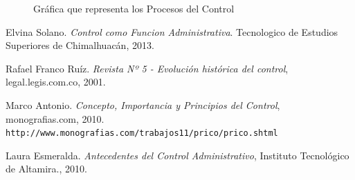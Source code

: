 \documentclass[12pt,letterpaper]{article}
\begin{document}
\begin{figure}[ht]
\centering
{}
\caption{Gráfica que representa los Procesos del Control}
\end{figure}



\newpage


\begin{thebibliography}{9}
Elvina Solano.
\textit{Control como Funcion Administrativa}. 
Tecnologico de Estudios Superiores de Chimalhuacán, 2013.
 
Rafael Franco Ruíz. \textit{Revista Nº 5 - Evolución histórica del control}, legal.legis.com.co, 2001.

 
Marco Antonio. \textit{Concepto, Importancia y Principios del Control}, monografias.com, 2010.
\\\texttt{http://www.monografias.com/trabajos11/prico/prico.shtml}

Laura Esmeralda. \textit{Antecedentes del Control  Administrativo}, Instituto Tecnológico de Altamira., 2010.

\end{thebibliography}
\end{document}
